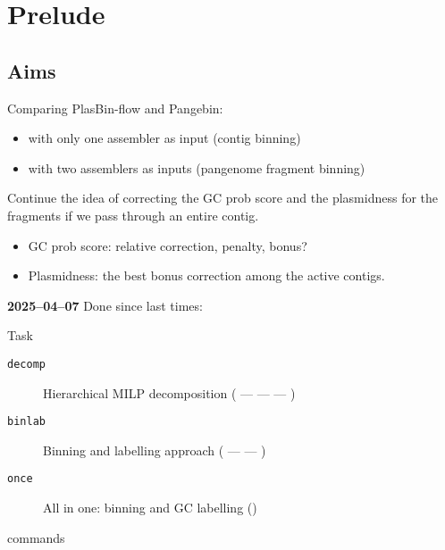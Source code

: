 \section*{Prelude}\label{sec:prelude}

\subsection*{Aims}\label{sec:prelude:aims}

\begin{description}[style=nextline]
  \item[Benchmarking]
    Comparing PlasBin-flow and Pangebin:
    \begin{itemize}
      \item with only one assembler as input (contig binning)
      \item with two assemblers as inputs (pangenome fragment binning)
    \end{itemize}
  \item[Binning panassembly graphs]
    Continue the idea of correcting the GC prob score and the plasmidness for the fragments if we pass through an entire contig.
    \begin{itemize}
      \item GC prob score: relative correction, penalty, bonus?
      \item Plasmidness: the best bonus correction among the active contigs.
    \end{itemize}
\end{description}

\begin{newfeatbox}
  \textbf{2025--04--07} Done since last times:

  \begin{CheckList}{Task}
    \begin{description}
      \item[\texttt{decomp}] Hierarchical MILP decomposition (\MCF{} --- \MGC{} --- \MPS{} --- \MRCF{})
      \item[\texttt{binlab}] Binning and labelling approach (\MBS{} --- \MLS{} --- \MRBS{})
      \item[\texttt{once}] All in one: binning and GC labelling (\MGCLB{})
    \end{description}
     commands
  \end{CheckList}
\end{newfeatbox}

